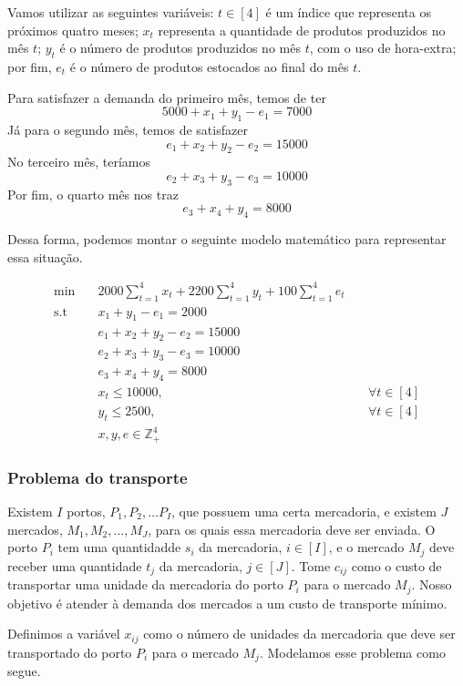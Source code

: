 \documentclass[]{article}
\numberwithin{equation}{section}
\begin{document}
Vamos utilizar as seguintes variáveis: $t \in [4]$ é um índice que representa os próximos quatro meses; $x_t$ representa a quantidade de produtos produzidos no mês $t$; $y_t$ é o número de produtos produzidos no mês $t$, com o uso de hora-extra; por fim, $e_t$ é o número de produtos estocados ao final do mês $t$.

Para satisfazer a demanda do primeiro mês, temos de ter
$$
5000 + x_1 + y_1 - e_1 = 7000
$$
Já para o segundo mês, temos de satisfazer
$$
e_1 + x_2 + y_2 - e_2 = 15000
$$
No terceiro mês, teríamos
$$
e_2 + x_3 + y_3 - e_3 = 10000
$$
Por fim, o quarto mês nos traz
$$
e_3 + x_4 + y_4 = 8000
$$

Dessa forma, podemos montar o seguinte modelo matemático para representar essa situação.

\begin{align}
\min        &\quad  2000\sum_{t = 1}^4 x_t + 2200\sum_{t = 1}^4 y_t + 100\sum_{t = 1}^4 e_t \\
\text{s.t}  &\quad  x_1 + y_1 - e_1 = 2000 \\
            &\quad  e_1 + x_2 + y_2 - e_2 = 15000 \\
            &\quad  e_2 + x_3 + y_3 - e_3 = 10000 \\
            &\quad  e_3 + x_4 + y_4 = 8000 \\
            &\quad  x_t \leq 10000, &\quad \forall t \in [4] \\
            &\quad  y_t \leq 2500, &\quad \forall t \in [4] \\
            &\quad  x, y, e \in \mathbb{Z}_+^4
\end{align}

\subsubsection{Problema do transporte}

Existem $I$ portos, $P_1, P_2, \dots P_I$, que possuem uma certa mercadoria,
e existem $J$ mercados, $M_1, M_2, \dots, M_J$, para os quais essa mercadoria deve ser enviada.
O porto $P_i$ tem uma quantidadde $s_i$ da mercadoria, $i \in [I]$, e o mercado $M_j$ deve receber
uma quantidade $t_j$ da mercadoria, $j \in [J]$.
Tome $c_{ij}$ como o custo de transportar uma unidade da mercadoria do porto $P_i$ para o mercado
$M_j$.
Nosso objetivo é atender à demanda dos mercados a um custo de transporte mínimo.

Definimos a variável $x_{ij}$ como o número de unidades da mercadoria que deve ser transportado do
porto $P_i$ para o mercado $M_j$. Modelamos esse problema como segue.
\end{document}
